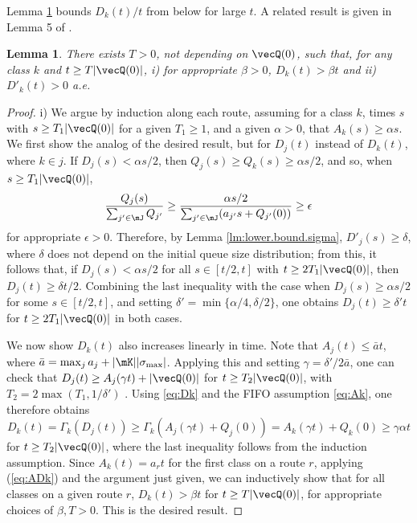 \documentclass{amsart}
\newtheorem{lemma}{Lemma}
\begin{document}
Lemma \ref{pr:D'.positive} bounds $D_k(t)/t$ from below for large $t$.  A related result is given in Lemma 5 of \cite{Ma07}.

\begin{lemma}\label{pr:D'.positive} 
There exists $T >0$, not depending on $\vecQ(0)$,  such that, for any class $k$ and $t\ge T|\vecQ(0)|$,  
\noindent i) for appropriate $\beta >0$,
 $D_k(t) >   \beta t$  and \noindent ii)  $D'_k(t)>0$ a.e.

\iffalse
For each $k\in\mK$ 
  \begin{equation}\label{eq:D.unbounded}
  \limsup_{t\rightarrow\infty} \frac{D_k(t)}{t} > 0\, .
  \end{equation}
\fi
\end{lemma}
\begin{proof}

\noindent i) We argue by induction along each route, assuming for a class $k$, times $s$ with $s\ge T_1|\vecQ(0)|$ for a given $T_1\ge 1$, and a given $\alpha>0$, that $A_k(s)\geq \alpha s$.
We first show the analog of the desired result, but for $D_j(t)$ instead of $D_k(t)$, where $k\in j$.
If $D_j(s) < \alpha s/2$, then $Q_j(s)\geq Q_k(s)\geq \alpha s/2 $, and so, when $s\ge T_1|\vecQ(0)|$,
\begin{equation*}
\frac{Q_j(s)}{\sum_{j\rq{}\in\mJ} Q_{j\rq{}}} \geq \frac{\alpha s/2 }{\sum_{j'\in\mJ} (a_{j'} s + Q_{j'}(0)) } \geq \epsilon
\end{equation*}
for appropriate $\epsilon>0$. 
Therefore, by Lemma \ref{lm:lower.bound.sigma}, $D'_j(s) \geq \delta$, where $\delta$ does not depend on the initial queue size distribution; from this, it follows
that, if $D_j(s) < \alpha s/2$ for all $s\in [t/2,t]$ with $t\ge 2T_1|\vecQ(0)|$, then $D_j(t)\ge \delta t/2$.
Combining the last inequality with the case when $D_j(s) \ge \alpha s/2$ for some $s\in [t/2,t]$,  and setting $ \delta'= \min\{ \alpha/4 , \delta/2 \}$, one obtains $D_j(t) \geq  \delta't$ for $t\ge 2T_1|\vecQ(0)|$ in both cases.

We now show $D_k(t)$ also increases linearly in time.  Note that $A_j(t) \le \bar{a} t $, where $\bar{a}= \max_j{a_j}+ |\mK| |\sigma_{\max}|$. Applying this and setting $\gamma=  \delta'/2\bar{a}$, one can check that 
$D_j(t) \geq A_j(\gamma t) + |\vecQ(0)|$ for $t\ge T_2|\vecQ(0)|$, with $T_2 = 2 \max(T_1, 1/\delta')$ .
Using \eqref{eq:Dk} and the FIFO assumption \eqref{eq:Ak}, one therefore obtains
\begin{equation*}
D_k(t) = \Gamma_k(D_j(t)) \geq \Gamma_k(A_j(\gamma t) + Q_j(0)) = A_k(\gamma t) + Q_k(0) \geq \gamma \alpha t
\end{equation*}
for $t\ge T_2|\vecQ(0)|$, where the last inequality follows from the induction assumption.  Since $A_k(t)=a_r t$ for the first class on a route $r$, applying (\ref{eq:ADk}) and the argument just given, we can inductively show that for all classes on a given route $r$, $D_k(t) > \beta t$ for $t \ge T|\vecQ(0)|$, for appropriate choices of $\beta,T>0$. This is the desired result.


\end{proof}
\end{document}
